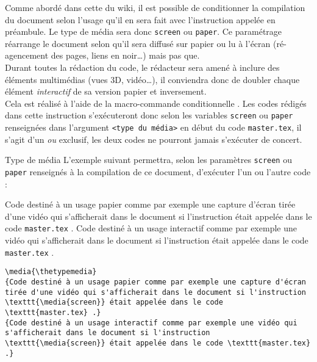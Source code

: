 \documentclass[a4paper, 11pt, twoside, fleqn]{memoir}
\begin{document}
Comme abordé dans cette  du wiki, il est possible de conditionner la compilation du document selon l'usage qu'il en sera fait avec l'instruction \texttt{} appelée en préambule. Le type de média sera donc \texttt{screen} ou \texttt{paper}. Ce paramétrage réarrange le document selon qu'il sera diffusé sur papier ou lu à l'écran (ré-agencement des pages, liens en noir\ldots) mais pas que.\\
 Durant toutes la rédaction du code, le rédacteur sera amené à inclure des éléments multimédias (vues 3D, vidéo\ldots), il conviendra donc de doubler chaque élément \emph{interactif} de sa version papier et inversement.\\
 Cela est réalisé à l'aide de la macro-commande conditionnelle \texttt{}. Les codes rédigés dans cette instruction s'exécuteront donc selon les variables \texttt{screen} ou \texttt{paper} renseignées dans l'argument \texttt{{<type du média>}} en début du code \texttt{master.tex}, il s'agit d'un \emph{ou} exclusif, les deux codes ne pourront jamais s'exécuter de concert.
 
\begin{exemple}{Type de média}{}
L'exemple suivant permettra, selon les paramètres \texttt{screen} ou \texttt{paper} renseignés à la compilation de ce document, d'exécuter l'un ou l'autre code :\\

\begin{minipage}[t]{0.45\linewidth}
\media{\thetypemedia}
{Code destiné à un usage papier comme par exemple une capture d'écran tirée d'une vidéo qui s'afficherait dans le document si l'instruction \texttt{} était appelée dans le code \texttt{master.tex} .}
{Code destiné à un usage interactif comme par exemple une vidéo qui s'afficherait dans le document si l'instruction \texttt{} était appelée dans le code \texttt{master.tex} .}
\end{minipage}
\hfill
\begin{minipage}[t]{0.5\linewidth}
\begin{verbatim}
\media{\thetypemedia}
{Code destiné à un usage papier comme par exemple une capture d'écran tirée d'une vidéo qui s'afficherait dans le document si l'instruction \texttt{\media{screen}} était appelée dans le code  \texttt{master.tex} .}
{Code destiné à un usage interactif comme par exemple une vidéo qui s'afficherait dans le document si l'instruction \texttt{\media{screen}} était appelée dans le code \texttt{master.tex} .}
\end{verbatim}
\end{minipage}
\end{exemple}
\end{document}
